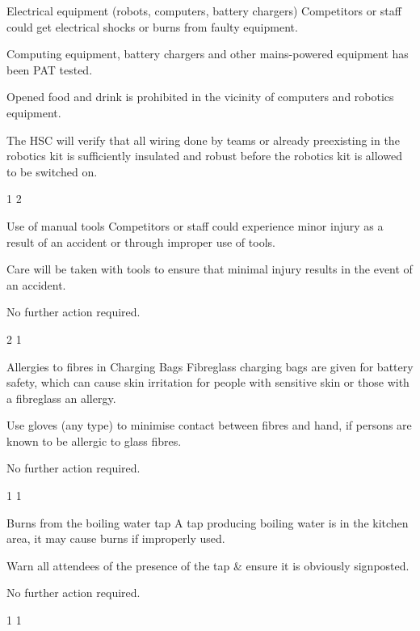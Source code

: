 {    \risk
        {Electrical equipment (robots, computers, battery chargers)}
        {Competitors or staff could get electrical shocks or burns from faulty
         equipment.}
        {\item Computing equipment, battery chargers and other mains-powered
         equipment has been PAT tested.
         \item Opened food and drink is prohibited in the vicinity of
         computers and robotics equipment.}
        {\item The HSC will verify that all wiring done by teams or already
         preexisting in the robotics kit is sufficiently insulated and robust
         before the robotics kit is allowed to be switched on.}
        {1} %
        {2} %

    \risk
        {Use of manual tools}
        {Competitors or staff could experience minor injury as a result of an
         accident or through improper use of tools.}
        {\item Care will be taken with tools to ensure that minimal injury
         results in the event of an accident.}
        {\item No further action required.}
        {2} %
        {1} %

    \risk
        {Allergies to fibres in Charging Bags}
        {Fibreglass charging bags are given for battery safety, which can
        cause skin irritation for people with sensitive skin or those with a
        fibreglass an allergy.}
        {\item Use gloves (any type) to minimise contact between fibres and hand, if persons
are known to be allergic to glass fibres.}
        {\item No further action required.}
        {1} %
        {1} %

    \risk
        {Burns from the boiling water tap}
        {A tap producing boiling water is in the kitchen area, it may cause burns if improperly used.}
        {\item Warn all attendees of the presence of the tap & ensure it is obviously signposted.}
        {\item No further action required.}
        {1} %
        {1} %
}


\newcommand{\postrisks}{
    \subsection*{Risk of fire}

    To minimise the risk of fire resulting from this activity, food and drink
    will not be allowed near electrical equipment, and naked flames will be
    prohibited. The risk of fire occurring elsewhere in the building(s) is
    controlled primarily by the building operator.
    The HSC will ensure that all people present are informed of the
    locations of the exits and whether any fire drills are expected to take
    place. Should a fire break out (or any other event requiring evacuation),
    all people are to evacuate through the nearest accessible exit.
}




